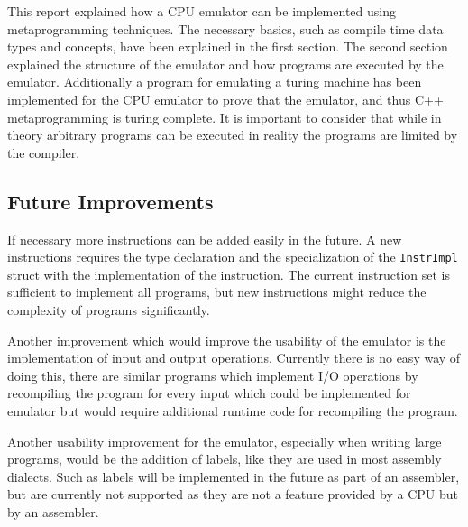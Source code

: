 
This report explained how a CPU emulator can be implemented using metaprogramming techniques.
The necessary basics, such as compile time data types and concepts, have been explained 
in the first section. The second section explained the structure of the emulator and how
programs are executed by the emulator. Additionally a program for emulating a turing
machine has been implemented for the CPU emulator to prove that the emulator, and thus
C++ metaprogramming is turing complete. It is important to consider that while in theory
arbitrary programs can be executed in reality the programs are limited by the compiler.

\subsection{Future Improvements}
If necessary more instructions can be added easily in the future. A new instructions
requires the type declaration and the specialization of the \lstinline{InstrImpl}
struct with the implementation of the instruction. The current instruction set
is sufficient to implement all programs, but new instructions might reduce the
complexity of programs significantly.

Another improvement which would improve the usability of the emulator is the implementation
of input and output operations. Currently there is no easy way of doing this, there are
similar programs which implement I/O operations by recompiling the program for
every input \cite{iohack1} \cite{iohack2} which could be implemented for
emulator but would require additional runtime code for recompiling the program.

Another usability improvement for the emulator, especially when writing large programs,
would be the addition of labels, like they are used in most assembly dialects.
Such as labels will be implemented in the future as part of an assembler, but are
currently not supported as they are not a feature provided by a CPU but by an assembler.
